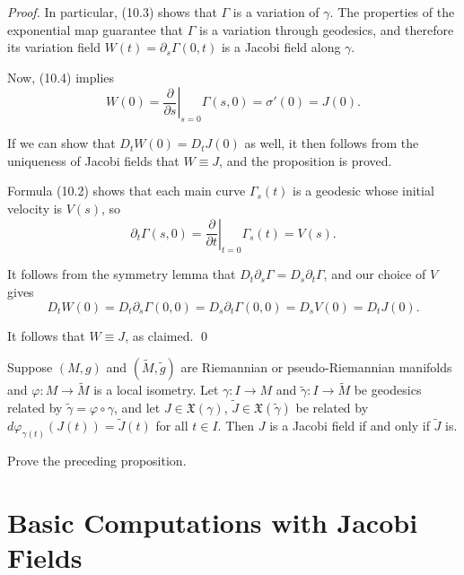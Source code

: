 \begin{proof}
In particular, (10.3) shows that $\Gamma$ is a variation of $\gamma$. The properties of the exponential map guarantee that $\Gamma$ is a variation through geodesics, and therefore its variation field $W(t) = \partial_s \Gamma(0,t)$ is a Jacobi field along $\gamma$.

Now, (10.4) implies
\[
W(0) = \left. \frac{\partial}{\partial s} \right|_{s=0} \Gamma(s,0) = \sigma'(0) = J(0).
\]

If we can show that $D_t W(0) = D_t J(0)$ as well, it then follows from the uniqueness of Jacobi fields that $W \equiv J$, and the proposition is proved.

Formula (10.2) shows that each main curve $\Gamma_s(t)$ is a geodesic whose initial velocity is $V(s)$, so
\[
\partial_t \Gamma(s,0) = \left. \frac{\partial}{\partial t} \right|_{t=0} \Gamma_s(t) = V(s).
\]

It follows from the symmetry lemma that $D_t \partial_s \Gamma = D_s \partial_t \Gamma$, and our choice of $V$ gives
\[
D_t W(0) = D_t \partial_s \Gamma(0,0) = D_s \partial_t \Gamma(0,0) = D_s V(0) = D_t J(0).
\]

It follows that $W \equiv J$, as claimed. \qed
\end{proof}


\begin{proposition}
\label{prop:local-isometry-invariance-jacobi-fields}

Suppose $(M, g)$ and $(\tilde{M}, \tilde{g})$ are Riemannian or pseudo-Riemannian manifolds and $\varphi : M \to \tilde{M}$ is a local isometry. Let $\gamma : I \to M$ and $\tilde{\gamma} : I \to \tilde{M}$ be geodesics related by $\tilde{\gamma} = \varphi \circ \gamma$, and let $J \in \mathfrak{X}(\gamma)$, $\tilde{J} \in \mathfrak{X}(\tilde{\gamma})$ be related by $d\varphi_{\gamma(t)}(J(t)) = \tilde{J}(t)$ for all $t \in I$. Then $J$ is a Jacobi field if and only if $\tilde{J}$ is.
\end{proposition}

\begin{exercise}
\label{exer:prove-local-isometry-invariance}

Prove the preceding proposition.
\end{exercise}

\section{Basic Computations with Jacobi Fields}

